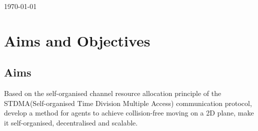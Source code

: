 \documentclass[12pt, oneside]{article}
\begin{document}
\begin{titlepage}
\begin{center}
        \vspace{0.8cm}
 
        \vspace{0.8cm}
        \today
        
    \end{center}
    
\end{titlepage}

\tableofcontents
\pagebreak


\section{Aims and Objectives}
\subsection{Aims}
Based on the self-organised channel resource allocation principle of the STDMA(Self-organised Time Division Multiple Access) \cite{STDMA} communication protocol, develop a method for agents to achieve collision-free moving on a 2D plane, make it self-organised, decentralised and scalable. 
\end{document}
